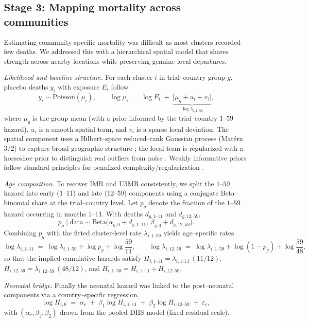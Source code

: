 \documentclass[11pt]{article}\usepackage[]{graphicx}\usepackage[]{xcolor}
\begin{document}
\subsection{Stage 3: Mapping mortality across communities}

Estimating community-specific mortality was difficult as most clusters recorded few deaths. We addressed this with a hierarchical spatial model that shares strength across nearby locations while preserving genuine local departures.

\emph{Likelihood and baseline structure.} For each cluster \(i\) in trial–country group \(g\), placebo deaths \(y_i\) with exposure \(E_i\) follow
\[
y_i \sim \mathrm{Poisson}(\mu_i), 
\qquad 
\log \mu_i \;=\; \log E_i \;+\; \underbrace{\bigl[\mu_g + u_i + v_i\bigr]}_{\log \lambda_{i,1\text{--}59}},
\]
where \(\mu_g\) is the group mean (with a prior informed by the trial–country \(1\text{--}59\) hazard), \(u_i\) is a smooth spatial term, and \(v_i\) is a sparse local deviation. The spatial component uses a Hilbert–space reduced–rank Gaussian process (Matérn \(3/2\)) to capture broad geographic structure \citep{solin2020hilbert,riutort2023practical}; the local term is regularized with a horseshoe prior to distinguish real outliers from noise \citep{carvalho2010horseshoe}. Weakly informative priors follow standard principles for penalized complexity/regularization \citep{simpson2017pc}.

\emph{Age composition.} To recover IMR and U5MR consistently, we split the \(1\text{--}59\) hazard into early (1–11) and late (12–59) components using a conjugate Beta–binomial share at the trial–country level. Let \(p_g\) denote the fraction of the \(1\text{--}59\) hazard occurring in months 1–11. With deaths \(d_{g,1\text{--}11}\) and \(d_{g,12\text{--}59}\),
\[
p_g \mid \text{data} \sim \mathrm{Beta}\!\bigl(\alpha_{g,0}+d_{g,1\text{--}11},\, \beta_{g,0}+d_{g,12\text{--}59}\bigr).
\]
Combining \(p_g\) with the fitted cluster-level rate \(\lambda_{i,1\text{--}59}\) yields age–specific rates
\[
\log \lambda_{i,1\text{--}11} \;=\; \log \lambda_{i,1\text{--}59} + \log p_g + \log\!\frac{59}{11}, 
\qquad
\log \lambda_{i,12\text{--}59} \;=\; \log \lambda_{i,1\text{--}59} + \log(1-p_g) + \log\!\frac{59}{48},
\]
so that the implied cumulative hazards satisfy 
\(H_{i,1\text{--}11}=\lambda_{i,1\text{--}11}\,(11/12)\),
\(H_{i,12\text{--}59}=\lambda_{i,12\text{--}59}\,(48/12)\), and
\(H_{i,1\text{--}59}=H_{i,1\text{--}11}+H_{i,12\text{--}59}\).

\emph{Neonatal bridge.} Finally the neonatal hazard was linked to the post–neonatal components via a country–specific regression,
\[
\log H_{i,0} \;=\; \alpha_c \;+\; \beta_1 \log H_{i,1\text{--}11} \;+\; \beta_2 \log H_{i,12\text{--}59} \;+\; \varepsilon_c,
\]
with \((\alpha_c,\beta_1,\beta_2)\) drawn from the pooled DHS model (fixed residual scale).
\end{document}
